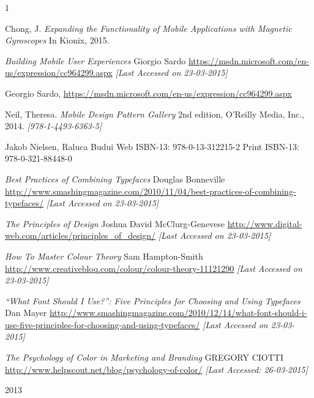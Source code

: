 1\begin{thebibliography}{9}

  Chong, J. 
  \textit{Expanding the Functionality of Mobile Applications with Magnetic Gyroscopes} 
  In Kionix,
  2015.
  
	\textit{Building Mobile User Experiences}
	Giorgio Sardo
	\url{https://msdn.microsoft.com/en-us/expression/cc964299.aspx}
	\textit{[Last Accessed on 23-03-2015]}
	
  Georgio Sardo,
  \url{https://msdn.microsoft.com/en-us/expression/cc964299.aspx}
  

	Neil, Theresa.
	\textit{Mobile Design Pattern Gallery}
	2nd edition,
	O'Reilly Media, Inc.,
	2014.
	\textit{[978-1-4493-6363-5]}
		
	Jakob Nielsen, Raluca Budui
	Web ISBN-13: 978-0-13-312215-2
	Print ISBN-13: 978-0-321-88448-0
	
	\textit{Best Practices of Combining Typefaces}
	Douglas Bonneville
	\url{http://www.smashingmagazine.com/2010/11/04/best-practices-of-combining-typefaces/}
	\textit{[Last Accessed on 23-03-2015]}
	
	\textit{The Principles of Design}
	Joshua David McClurg-Genevese
	\url{http://www.digital-web.com/articles/principles_of_design/}
	\textit{[Last Accessed on 23-03-2015]}
	
	\textit{How To Master Colour Theory}
	Sam Hampton-Smith
	\url{http://www.creativebloq.com/colour/colour-theory-11121290}
	\textit{[Last Accessed on 23-03-2015]}
	
	\textit{“What Font Should I Use?”: Five Principles for Choosing and Using Typefaces}
	Dan Mayer
	\url{http://www.smashingmagazine.com/2010/12/14/what-font-should-i-use-five-principles-for-choosing-and-using-typefaces/}
	\textit{[Last Accessed on 23-03-2015]}
	
	\textit{The Psychology of Color in Marketing and Branding}
	GREGORY CIOTTI
	\url{http://www.helpscout.net/blog/psychology-of-color/}
	\textit{[Last Accessed: 26-03-2015]}
		
	
\end{thebibliography}2013